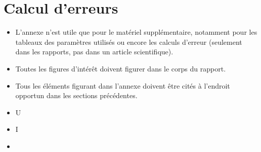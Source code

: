 \section{Calcul d'erreurs}

\begin{itemize}
\item L'annexe n'est utile que pour le matériel supplémentaire, notamment pour les tableaux des paramètres utilisés ou encore les calculs d'erreur (seulement dans les rapports, pas dans un article scientifique).
\item Toutes les figures d'intérêt doivent figurer dans le corps du rapport.
\item Tous les éléments figurant dans l'annexe doivent être cités à l'endroit opportun dans les sections précédentes.
\end{itemize}

\begin{itemize}
    \item \Delta U
    \item \Delta I
    \item 
\end{itemize}